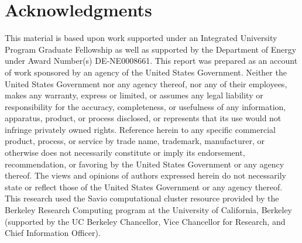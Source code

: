 \documentclass{article} %
\begin{document}
\pagebreak
\section*{Acknowledgments}

This material is based upon work supported under an Integrated
University Program Graduate Fellowship as well as supported by the Department 
of Energy under Award Number(s) DE-NE0008661. This report was prepared as an
account of work sponsored by an agency of the United States Government.
Neither the United States Government nor any agency thereof, nor any of their
employees, makes any warranty, express or limited, or assumes any legal
liability or responsibility for the accuracy, completeness, or usefulness of
any information, apparatus, product, or process disclosed, or represents that
its use would not infringe privately owned rights. Reference herein to any 
specific commercial product, process, or service by trade name, trademark, 
manufacturer, or otherwise does not necessarily constitute or imply its 
endorsement, recommendation, or favoring by the United States Government or
any agency thereof. The views and opinions of authors expressed herein do not 
necessarily state or reflect those of the United States Government or any 
agency thereof. This research used the Savio computational cluster resource 
provided by the Berkeley Research Computing program at the University of 
California, Berkeley (supported by the UC Berkeley Chancellor, Vice Chancellor
for Research, and Chief Information Officer).

\pagebreak



\end{document}
